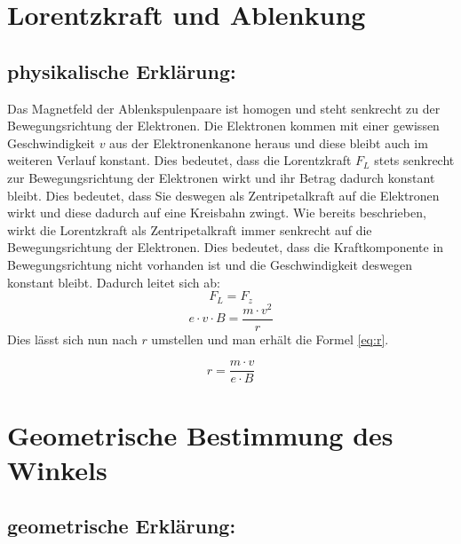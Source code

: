 \section{Lorentzkraft und Ablenkung}

\subsection{physikalische Erklärung:}

Das Magnetfeld der Ablenkspulenpaare ist homogen und steht senkrecht zu der Bewegungsrichtung der Elektronen.
Die Elektronen kommen mit einer gewissen Geschwindigkeit $v$ aus der Elektronenkanone heraus und diese bleibt auch im weiteren Verlauf konstant.
Dies bedeutet, dass die Lorentzkraft $F_L$ stets senkrecht zur Bewegungsrichtung der Elektronen wirkt und ihr Betrag dadurch konstant bleibt.
Dies bedeutet, dass Sie deswegen als Zentripetalkraft auf die Elektronen wirkt und diese dadurch auf eine Kreisbahn zwingt.
Wie bereits beschrieben, wirkt die Lorentzkraft als Zentripetalkraft immer senkrecht auf die Bewegungsrichtung der Elektronen.
Dies bedeutet, dass die Kraftkomponente in Bewegungsrichtung nicht vorhanden ist und die Geschwindigkeit deswegen konstant bleibt.
Dadurch leitet sich ab: 
$$ F_L=F_z$$
$$ e \cdot v \cdot B = \frac{m \cdot v^2}{r}$$
Dies lässt sich nun nach $r$ umstellen und man erhält die Formel \ref{eq:r}.   


\begin{equation}
     \label{eq:r}
     r = \frac{m \cdot v}{e \cdot B}
\end{equation}

\section{Geometrische Bestimmung des Winkels}

\subsection{geometrische Erklärung:}

